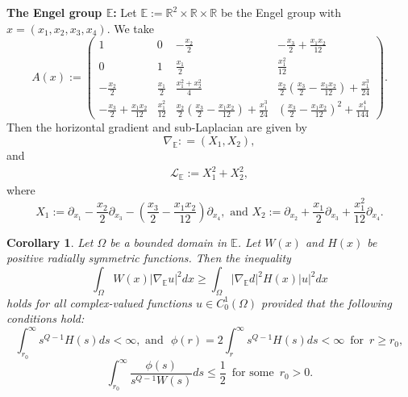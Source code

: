 \documentclass[a4paper,12pt,reqno]{amsart}
\theoremstyle{theorem}
\numberwithin{equation}{section}
\theoremstyle{plain}
\newtheorem{cor}[thm]{Corollary}
\theoremstyle{definition}
\theoremstyle{defi}
\begin{document}
\medskip
{\bf The Engel group $\mathbb{E}$:} Let $\mathbb{E}:= \mathbb{R}^2 \times \mathbb{R}\times \mathbb{R}$ be the Engel group with $x = (x_1,x_2,x_3,x_4)$. We take  
	$$A(x):=\begin{pmatrix}
	1 & 0 & -\frac{x_2}{2}& - \frac{x_3}{2} + \frac{x_1x_2}{12}\\ 0 & 1 & \frac{x_1}{2}& \frac{x_1^2}{12}\\
	-\frac{x_2}{2} & \frac{x_1}{2} & \frac{x_1^2+x_2^2}{4} &  \frac{x_2}{2}\left( \frac{x_3}{2} -\frac{x_1x_2}{12} \right) + \frac{x_1^3}{24} \\
	- \frac{x_3}{2} + \frac{x_1x_2}{12}&\frac{x_1^2}{12}& \frac{x_2}{2}\left( \frac{x_3}{2} -\frac{x_1x_2}{12} \right) + \frac{x_1^3}{24} & \left( \frac{x_3}{2} -\frac{x_1x_2}{12} \right)^2 + \frac{x_1^4}{144}
	\end{pmatrix}.$$
	Then the horizontal gradient and sub-Laplacian are given by 
	\begin{equation*}
	\nabla_{\mathbb{E}} : = (X_1,X_2),
	\end{equation*}  
	and
	\begin{align*}
	\mathcal{L}_{\mathbb{E}}:=   X_1^2 + X_2^2,
	\end{align*}
	where
	\begin{equation*}
	X_1:= \partial_{x_1} - \frac{x_2}{2} \partial_{x_3} - \left(\frac{x_3}{2}-\frac{x_1x_2}{12}\right)\partial_{x_4}, \,\, \text{and} \,\, X_2:=\partial_{x_2} + \frac{x_1}{2} \partial_{x_3} + \frac{x_1^2}{12} \partial_{x_4}.
	\end{equation*}

\begin{cor}
	Let $\Omega$ be a bounded domain in $\mathbb{E}$. Let $W(x)$ and $H(x)$ be positive radially symmetric functions. Then the inequality 
	\begin{equation}
	\int_{\Omega} W(x) |\nabla_{\mathbb{E}} u|^2 dx \geq \int_{\Omega} |\nabla_{\mathbb{E}} d|^2 H(x) |u|^2 dx
	\end{equation}
	holds for all complex-valued functions $u \in C^1_0(\Omega)$ provided that the following conditions hold: 
	\begin{equation}
	\int_{r_0}^{\infty} s^{Q-1}H(s) ds< \infty, \,\, \text{and} \,\, \,\,	\phi(r) = 2 \int_{r}^{\infty} s^{Q-1}H(s) ds < \infty \,\,\, \text{for} \,\,\, r\geq r_0,
	\end{equation}
	\begin{equation}
	\int_{r_0}^{\infty}  \frac{\phi(s)}{s^{Q-1}W(s)} ds  \leq \frac{1}{2} \,\,\, \text{for some} \,\,\, r_0>0.
	\end{equation}
\end{cor}
\end{document}
